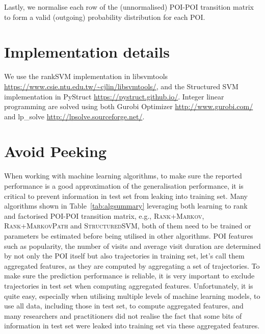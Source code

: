 Lastly, we normalise each row of the (unnormalised) POI-POI transition matrix 
to form a valid (outgoing) probability distribution for each POI.


\section{Implementation details}
We use the rankSVM implementation in libsvmtools \url{https://www.csie.ntu.edu.tw/~cjlin/libsvmtools/},
and the Structured SVM implementation in PyStruct \url{https://pystruct.github.io/}.
Integer linear programming are solved using both Gurobi Optimizer \url{http://www.gurobi.com/} 
and lp\_solve \url{http://lpsolve.sourceforge.net/}.


\section{Avoid Peeking}
When working with machine learning algorithms, to make sure the reported performance is a good approximation
of the generalisation performance, it is critical to prevent information in test set from leaking into
training set.
Many algorithms shown in Table~\ref{tab:algsummary} leveraging both learning to rank and 
factorised POI-POI transition matrix,
e.g., \textsc{Rank+Markov}, \textsc{Rank+MarkovPath} and \textsc{StructuredSVM},
both of them need to be trained or parameters be estimated before being utilised in other algorithms.
POI features such as popularity, the number of visits and average visit duration are
determined by not only the POI itself but also trajectories in training set, 
let's call them aggregated features, as they are computed by aggregating a set of trajectories.
To make sure the prediction performance is reliable, 
it is very important to exclude trajectories in test set when computing aggregated features.
Unfortunately, it is quite easy, especially when utilising multiple levels of machine learning models,
to use all data, including those in test set, to compute aggregated features, 
and many researchers and practitioners did not realise the fact that 
some bits of information in test set were leaked into training set via these aggregated features.

